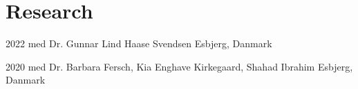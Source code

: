 \section{Research}
\mySubHeadingListStart

  \mySubHeading
  {}
  {2022}
  {med Dr. Gunnar Lind Haase Svendsen}
  {Esbjerg, Danmark}
  \myItemListStart
  \myItemListEnd

  \mySubHeading
  {}
  {2020}
  {med Dr. Barbara Fersch, Kia Enghave Kirkegaard, Shahad Ibrahim}
  {Esbjerg, Danmark}
  \myItemListStart
  \myItemListEnd


\mySubHeadingListEnd
